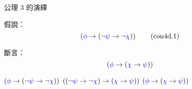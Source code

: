 \documentclass{Slideshow}
\begin{document}
\begin{frame}{公理 3 的演繹}
    \begin{theorem}
        \newcommand{\hyp}{\wi\wph{\wi{\wn\wps}{\wn\wch}}}

        假說：
        \[ \hyp \tag{con4d.1} \]

        斷言：
        \[ \left( {\color{blue}\phi} \to \left( {\color{blue}\chi} \to {\color{blue}\psi} \right) \right) \]

        \begin{mmproof}
            \begin{mmtable}{2em}{4em}
                    $\hyp$
                    \label{con4d:1}
                    $\left( \left( \neg{\color{blue}\psi} \to \neg{\color{blue}\chi} \right) \to \left( {\color{blue}\chi} \to {\color{blue}\psi} \right) \right)$
                    \label{con4d:ax-3}
                    $\left( {\color{blue}\phi} \to \left( {\color{blue}\chi} \to {\color{blue}\psi} \right) \right)$
            \end{mmtable}
        \end{mmproof}
    \end{theorem}
\end{frame}
\end{document}
